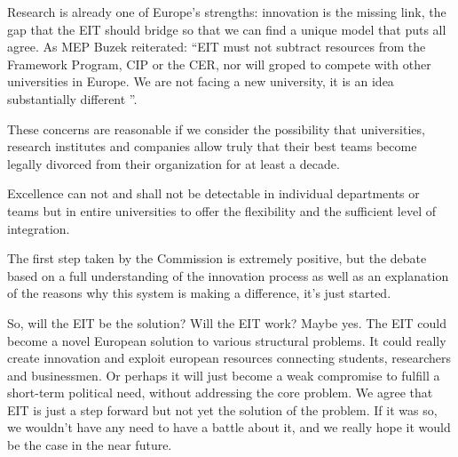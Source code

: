 \documentclass[11pt,a4paper,oneside,twocolumn]{IEEEtran}
\begin{document}
Research is already one of Europe's strengths: innovation is the missing link, the gap that the EIT should bridge so that we can find a unique model that puts all agree.
As MEP Buzek reiterated: ``EIT must not subtract resources from the Framework Program, CIP or the CER, nor will groped to compete with other universities in Europe. We are not facing a new university, it is an idea substantially different ''.

These concerns are reasonable if we consider the possibility that universities, research institutes and companies allow truly that their best teams become legally divorced from their organization for at least a decade.

Excellence can not and shall not be detectable in individual departments or teams but in entire universities to offer the flexibility and the sufficient level of integration.

The first step taken by the Commission is extremely positive, but the debate based on a full understanding of the innovation process as well as an explanation of the reasons why this system is making a difference, it's just started.

So, will the EIT be the solution? Will the EIT work? Maybe yes. The EIT could become a novel European solution to various structural problems. It could really create innovation and exploit european resources connecting students, researchers and businessmen. Or perhaps it will just become a weak compromise to fulfill a short-term political need, without addressing the core problem. We agree that EIT is just a step forward but not yet the solution of the problem. If it was so, we wouldn’t have any need to have a battle about it, and we really hope it would be the case in the near future.




\end{document}
